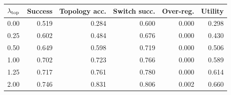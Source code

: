\begin{tabular}{lrrrrr}
\toprule
$\lambda_{\rm top}$ & Success & Topology acc. & Switch succ. & Over-reg. & Utility \\
\midrule
0.00 & 0.519 & 0.284 & 0.600 & 0.000 & 0.298 \\
0.25 & 0.602 & 0.484 & 0.676 & 0.000 & 0.430 \\
0.50 & 0.649 & 0.598 & 0.719 & 0.000 & 0.506 \\
1.00 & 0.702 & 0.723 & 0.766 & 0.000 & 0.589 \\
1.25 & 0.717 & 0.761 & 0.780 & 0.000 & 0.614 \\
2.00 & 0.746 & 0.831 & 0.806 & 0.002 & 0.660 \\
\bottomrule
\end{tabular}
